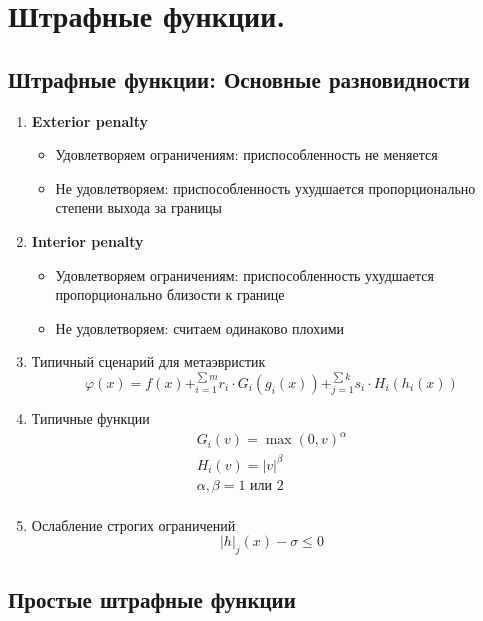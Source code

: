\section{Штрафные функции.}

\subsection{Штрафные функции: Основные разновидности}
\begin{enumerate}
    \item \textbf{Exterior penalty}
    \begin{itemize}
        \item Удовлетворяем ограничениям: приспособленность не меняется
        \item Не удовлетворяем: приспособленность ухудшается пропорционально степени выхода за границы
    \end{itemize}


    \item \textbf{Interior penalty}
    \begin{itemize}
        \item  Удовлетворяем ограничениям: приспособленность ухудшается пропорционально близости к границе
        \item  Не удовлетворяем: считаем одинаково плохими
    \end{itemize}

    \item Типичный сценарий для метаэвристик \[\varphi(x) = f(x) + ^{\sum m} _{i=1} r_{i} \cdot G_{i}(g_{i}(x)) + ^{\sum k} _{j=1} s_{i} \cdot H_{i}(h_{i}(x))\]
    \item Типичные функции \begin{gather*}
                               G_{i}(v) = \max(0, v)^{\alpha}\\
                               H_{i}(v) = |v|^{\beta}\\
                               \alpha, \beta = 1 \text{ или } 2\\
    \end{gather*}
    \item Ослабление строгих ограничений \[|h|_{j}(x) - \sigma \leq 0\]
\end{enumerate}


\subsection{Простые штрафные функции}

